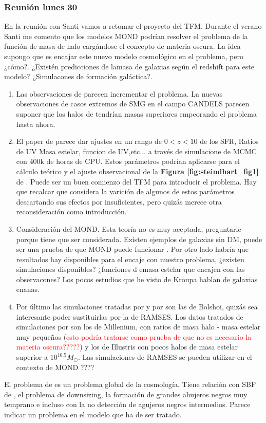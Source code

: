 \subsubsection*{Reunión lunes 30}
En la reunión con Santi vamos a retomar el proyecto del TFM. Durante el verano Santi me comento que los modelos MOND podrían resolver el problema de la función de masa de halo cargándose el concepto de materia oscura. La idea supongo que es encajar este nuevo modelo cosmológico en el problema, pero ¿cómo?. ¿Existén predicciones de lamasa de galaxias según el redshift para este modelo? ¿Simulacones de formación galáctica?.
\begin{enumerate}
\item Las observaciones de \cite{wang2019dominant} parecen incrementar el problema. La nuevas observaciones de casos extremos de SMG en el campo CANDELS parecen suponer que los halos de tendrían masas superiores empeorando el problema hasta ahora.
\item El paper de \cite{behroozi2019universemachine} parece dar ajustes en un rango de $0<z<10$ de los SFR, Ratios de UV Masa estelar, funcion de UV,etc... a través de simulacione de MCMC con 400k de horas de CPU. Estos parámetros podrían aplicarse para el cálculo teórico y el ajuste observacional de la \textbf{Figura \ref{fig:steindhart_fig1}} de \cite{steinhardt2016impossibly}. Puede ser un buen comienzo del TFM para introducir el problema. Hay que recalcar que \cite{steinhardt2016impossibly} considera la varición de algunos de estos parámetros descartando sus efectos por insuficientes, pero quizás merece otra reconsideración como introducción.
\item Consideración del MOND. Esta teoría no es muy aceptada, preguntarle porque tiene que ser considerada. Existen ejemplos de galaxias sin DM, puede ser una prueba de que MOND puede funcionar \citep{van2018galaxy}. Por otro lado habría que resultados hay disponibles para el encaje con nuestro problema, ¿existen simulaciones disponibles? ¿funciones d emasa estelar que encajen con las observacones? Los pocos estudios que he visto de Kroupa hablan de galaxias enanas.
\item Por último las simulaciones tratadas por \cite{behroozi2019universemachine} y por \cite{finkelstein2015increasing} son las de Bolshoi, quizás sea interesante poder sustituirlas por la de RAMSES. Los datos tratados de simulaciones por \cite{steinhardt2016impossibly} son los de Millenium, con ratios de masa halo - masa estelar muy pequeños (\textcolor{red}{esto podría tratarse como prueba de que no es necesario la materia oscura?????}) y los de Illustris con pocos halos de masa estelar superior a $10^{10.5}M_\odot$. Las simulaciones de RAMSES se pueden utilizar en el contexto de MOND ????
\end{enumerate}

El problema de \cite{steinhardt2016impossibly} es un problema global de la cosmología. Tiene relación con SBF de \cite{finkelstein2015increasing}, el problema de downsizing, la formación de grandes ahujeros negros muy temprano e incluso con la no detección de agujeros negros intermedios. Parece indicar un problema en el modelo que ha de ser tratado.